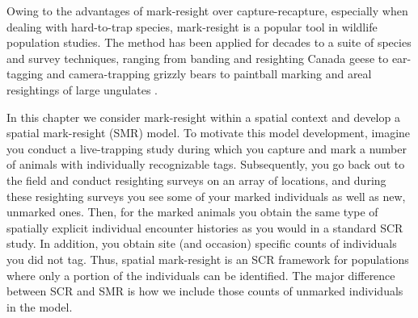 Owing to the advantages of mark-resight over capture-recapture,
especially when dealing with hard-to-trap species, mark-resight is a
popular tool in wildlife population studies. The method has been
applied for decades
to a suite of species and survey techniques,
ranging from banding and resighting Canada geese
\citep{hestbeck_malecki:1989} to ear-tagging and camera-trapping
grizzly bears \citep{mace_etal:1994} to paintball marking and areal
resightings of large ungulates \citep{skalski_etal:2005jwm}.

In this chapter we consider mark-resight within
a spatial context and
develop a spatial mark-resight (SMR) model. To motivate this model
development, imagine you conduct a live-trapping study during which
you capture and mark a number of animals with individually
recognizable tags. Subsequently, you go back out to the field and
conduct resighting surveys on an array of locations, and during these
resighting surveys you see some of your marked individuals as well as
new, unmarked ones. Then, for the marked animals you obtain the same
type of spatially explicit individual encounter histories as you would
in a standard SCR study. In addition, you obtain site (and occasion)
specific counts of individuals you did not tag. Thus, spatial
mark-resight is an SCR framework for populations where only a portion of
the individuals can be identified. The major difference between SCR
and SMR is how we include those counts of unmarked individuals in the
model. 

